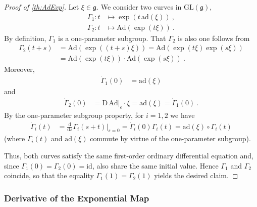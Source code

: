 \documentclass[10pt,a4paper]{article}
\theoremstyle{mytheorem}
\theoremstyle{mydefinition}
\newcommand{\dt}{\mathrm{d}}
\newcommand{\Dt}{\mathrm{D}}
\newcommand{\ad}{\mathrm{ad}}
\newcommand{\Ad}{\mathrm{Ad}}
\begin{document}
\begin{proof}[Proof of \ref{th:AdExp}]
Let $\xi\in\mathfrak{g}$.
We consider two curves in $\mathrm{GL}(\mathfrak{g})$,
\begin{align*}
	\Gamma_1: t&\mapsto \exp(t\,\ad(\xi))
	\ ,\\
	\Gamma_2: t&\mapsto \Ad(\exp(t\xi))
	\ .
\end{align*}
By definition, $\Gamma_1$ is a one-parameter subgroup.
That $\Gamma_2$ is also one follows from
\begin{align*}
	\Gamma_2(t+s)
	&= \Ad(\exp((t+s)\xi))
	= \Ad(\exp(t\xi)\exp(s\xi))
	\nonumber\\
	&= \Ad(\exp(t\xi))\cdot\Ad(\exp(s\xi))
	\ .
\end{align*}
Moreover,
\begin{align*}
	\dot{\Gamma}_1(0)
	&= \ad(\xi)
\end{align*}
and
\begin{align*}
	\dot{\Gamma}_2(0)
	&= \Dt\,\Ad|_e\cdot \xi = \ad(\xi) = \dot{\Gamma}_1(0)
	\ .
\end{align*}
By the one-parameter subgroup property, for $i=1,2$ we have
\begin{align*}
	\dot{\Gamma}_i(t)
	&=
	\frac{\dt}{\dt s}
	\Gamma_i(s+t)
	\Big|_{s=0}
	= \dot{\Gamma}_i(0)\Gamma_i(t)
	= \ad(\xi)\circ\Gamma_i(t)
\end{align*}
(where $\Gamma_i(t)$ and $\ad(\xi)$ commute by virtue of the one-parameter subgroup).

Thus, both curves satisfy the same first-order ordinary differential equation and, since $\Gamma_1(0)=\Gamma_2(0)=\mathrm{id}$, also share the same initial value.
Hence $\Gamma_1$ and $\Gamma_2$ coincide,
so that the equality $\Gamma_1(1)=\Gamma_2(1)$ yields the desired claim.
\end{proof}

\subsubsection{Derivative of the Exponential Map}
\end{document}
